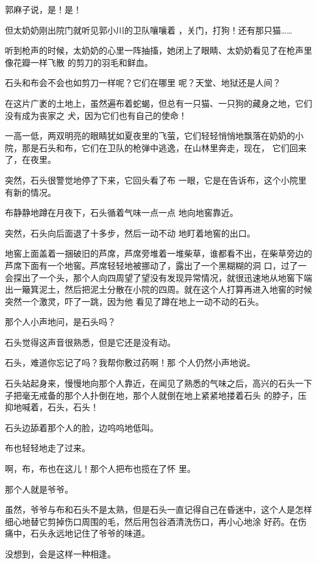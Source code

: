 \documentclass{article}
\begin{document}
郭麻子说，是！是！ 

但太奶奶刚出院门就听见郭小川的卫队嚷嚷着
，关门，打狗！还有那只猫…… 

听到枪声的时候，太奶奶的心里一阵抽搐，她闭上了眼睛、太奶奶看见了在枪声里像花瓣一样飞散
的剪刀的羽毛和鲜血。 

石头和布会不会也如剪刀一样呢？它们在哪里
呢？天堂、地狱还是人间？ 

\newpage

在这片广袤的土地上，虽然遍布着蛇蝎，但总有一只猫、一只狗的藏身之地，它们没有成为丧家之
犬，因为它们也有自己的使命！ 

一高一低，两双明亮的眼睛犹如夏夜里的飞萤，它们轻轻悄悄地飘落在奶奶的小院，那是石头和布，它们在卫队的枪弹中逃逸，在山林里奔走，现在，
它们回来了，在夜里。 

突然，石头很警觉地停了下来，它回头看了布
一眼，它是在告诉布，这个小院里有新的情况。 

布静静地蹲在月夜下，石头循着气味一点一点
地向地窖靠近。 

突然，石头向后面退了十多步，然后一动不动
地盯着地窖的出口。 

地窖上面盖着一捆破旧的芦席，芦席旁堆着一堆柴草，谁都看不出，在柴草旁边的芦席下面有一个地窖。芦席轻轻地被挪动了，露出了一个黑糊糊的洞
\newpage
口，过了一会探出了一个头，那个人向四周望了望没有发现异常情况，就很迅速地从地窖下端出一簸箕泥土，然后把泥土分散在小院的四周。就在这个人打算再进入地窖的时候突然一个激灵，吓了一跳，因为他
看见了蹲在地上一动不动的石头。 


那个人小声地问，是石头吗？ 

石头觉得这声音很熟悉，但是它还是没有动。

石头，难道你忘记了吗？我帮你敷过药啊！那
个人仍然小声地说。 

石头站起身来，慢慢地向那个人靠近，在闻见了熟悉的气味之后，高兴的石头一下子把毫无戒备的那个人扑倒在地，那个人就倒在地上紧紧地搂着石头
的脖子，压抑地喊着，石头，石头！ 


石头边舔着那个人的脸，边呜呜地低叫。 


\newpage

布也轻轻地走了过来。 

啊，布，布也在这儿！那个人把布也揽在了怀
里。 


那个人就是爷爷。 

虽然，爷爷与布和石头不是太熟，但是石头一直记得自己在昏迷中，这个人是怎样细心地替它剪掉伤口周围的毛，然后用包谷酒清洗伤口，再小心地涂
好药。在伤痛中，石头永远地记住了爷爷的味道。 


没想到，会是这样一种相逢。 
\end{document}
